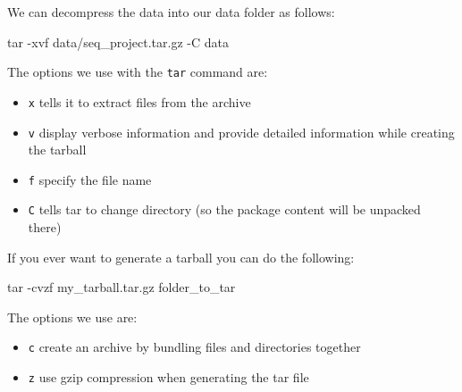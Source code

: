 \documentclass[
  letterpaper,
  DIV=11,
  numbers=noendperiod]{scrreprt}
\newenvironment{Shaded}{}{}
\newcommand{\AttributeTok}[1]{\textcolor[rgb]{0.84,0.23,0.29}{#1}}
\newcommand{\FunctionTok}[1]{\textcolor[rgb]{0.44,0.26,0.76}{#1}}
\newcommand{\NormalTok}[1]{\textcolor[rgb]{0.14,0.16,0.18}{#1}}
\providecommand{\tightlist}{%
  \setlength{\itemsep}{0pt}\setlength{\parskip}{0pt}}\usepackage{longtable,booktabs,array}
\begin{document}
We can decompress the data into our data folder as follows:

\begin{Shaded}
\begin{Highlighting}[]
\FunctionTok{tar} \AttributeTok{{-}xvf}\NormalTok{ data/seq\_project.tar.gz }\AttributeTok{{-}C}\NormalTok{ data}
\end{Highlighting}
\end{Shaded}

The options we use with the \texttt{tar} command are:

\begin{itemize}
\tightlist
\item
  \texttt{x} tells it to extract files from the archive
\item
  \texttt{v} display verbose information and provide detailed
  information while creating the tarball
\item
  \texttt{f} specify the file name
\item
  \texttt{C} tells tar to change directory (so the package content will
  be unpacked there)
\end{itemize}

\begin{tcolorbox}[enhanced jigsaw, rightrule=.15mm, colbacktitle=quarto-callout-tip-color!10!white, colframe=quarto-callout-tip-color-frame, colback=white, arc=.35mm, opacitybacktitle=0.6, coltitle=black, bottomtitle=1mm, breakable, bottomrule=.15mm, leftrule=.75mm, titlerule=0mm, title=\textcolor{quarto-callout-tip-color}{\faLightbulb}\hspace{0.5em}{Tip: how to generate a tarball}, toprule=.15mm, toptitle=1mm, opacityback=0, left=2mm]

If you ever want to generate a tarball you can do the following:

\begin{Shaded}
\begin{Highlighting}[]
\FunctionTok{tar} \AttributeTok{{-}cvzf}\NormalTok{ my\_tarball.tar.gz folder\_to\_tar}
\end{Highlighting}
\end{Shaded}

The options we use are:

\begin{itemize}
\tightlist
\item
  \texttt{c} create an archive by bundling files and directories
  together
\item
  \texttt{z} use gzip compression when generating the tar file
\end{itemize}

\end{tcolorbox}
\end{document}
